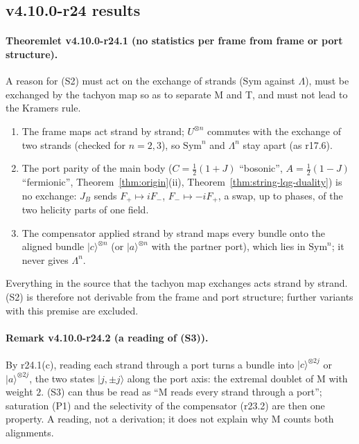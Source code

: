 \subsection*{v4.10.0-r24 results}
\label{subsec:v4100-r24-results}

\paragraph{Theoremlet v4.10.0-r24.1 (no statistics per frame from frame or port structure).}
A reason for (S2) must act on the exchange of strands (Sym against \(\Lambda\)), must be exchanged by the tachyon map so as to separate M
and T, and must not lead to the Kramers rule.
\begin{enumerate}[leftmargin=2em]
\item[(a)] The frame maps act strand by strand; \(U^{\otimes n}\) commutes with the exchange of two strands (checked for \(n=2,3\)), so
\(\mathrm{Sym}^n\) and \(\Lambda^n\) stay apart (as r17.6).
\item[(b)] The port parity of the main body (\(C=\tfrac12(1+J)\) ``bosonic'', \(A=\tfrac12(1-J)\) ``fermionic'', Theorem~\ref{thm:origin}(ii),
Theorem~\ref{thm:string-lqg-duality}) is no exchange: \(J_B\) sends \(F_+\mapsto iF_-\), \(F_-\mapsto-iF_+\), a swap, up to phases, of the two
helicity parts of one field.
\item[(c)] The compensator applied strand by strand maps every bundle onto the aligned bundle \(|c\rangle^{\otimes n}\) (or \(|a\rangle^{\otimes n}\) with
the partner port), which lies in \(\mathrm{Sym}^n\); it never gives \(\Lambda^n\).
\end{enumerate}
Everything in the source that the tachyon map exchanges acts strand by strand.  (S2) is therefore not derivable from the frame and port
structure; further variants with this premise are excluded.

\paragraph{Remark v4.10.0-r24.2 (a reading of (S3)).}
By r24.1(c), reading each strand through a port turns a bundle into \(|c\rangle^{\otimes2j}\) or \(|a\rangle^{\otimes2j}\), the two states \(|j,\pm j\rangle\) along the
port axis: the extremal doublet of M with weight \(2\).  (S3) can thus be read as ``M reads every strand through a port''; saturation
(P1) and the selectivity of the compensator (r23.2) are then one property.  A reading, not a derivation; it does not explain why M
counts both alignments.

